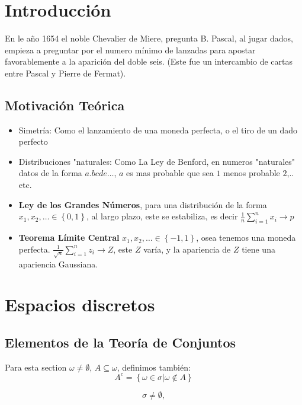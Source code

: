 \section{Introducción}
En le año 1654 el noble Chevalier de Miere, pregunta B. Pascal, al jugar dados, empieza a preguntar por el numero mínimo de lanzadas para apostar favorablemente a la aparición del doble seis. (Este fue un intercambio de cartas entre Pascal y Pierre de Fermat).
\subsection{Motivación Teórica}
\begin{itemize}
	\item Simetría: Como el lanzamiento de una moneda perfecta, o el tiro de un dado perfecto 
	
	\item Distribuciones "naturales: Como La Ley de Benford, en numeros "naturales" datos de la forma $a.bcde \ldots $, $a$ es mas probable que sea $1$ menos probable $2$,.. etc.
	
	\item \textbf{Ley de los Grandes Números}, para una distribución de la forma  $x_1, x_2, \ldots \in \left\lbrace 0, 1 \right\rbrace $, al largo plazo, este se estabiliza, es decir $ \frac{1}{n} \sum_{i=1}^{n} x_i \rightarrow p $
	
	\item \textbf{Teorema Límite Central} $x_1, x_2, \ldots \in \left\lbrace -1, 1 \right\rbrace $, osea tenemos una moneda perfecta.
	$\frac{1}{\sqrt{n}} \sum_{i =1}^{n}z_i \rightarrow Z $, este $Z$ varía, y la apariencia de $Z$ tiene una apariencia Gaussiana.
\end{itemize}

\section{Espacios discretos}
\subsection*{Elementos de la Teoría de Conjuntos}
Para esta section $ \omega \neq \emptyset $, $ A \subseteq \omega$, definimos también:
\[ A^c = \left\lbrace \omega \in \sigma | \omega \not \in A \right\rbrace \]
\begin{lema}
	\[ \sigma \neq \emptyset,  \]
\end{lema}

